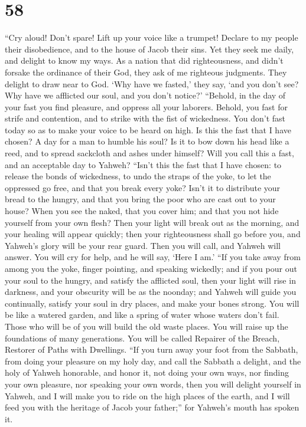 \hypertarget{section-55}{%
\section{58}\label{section-55}}

 ``Cry aloud! Don't spare! Lift up your voice like a
trumpet! Declare to my people their disobedience, and to the house of
Jacob their sins.  Yet they seek me daily, and delight to
know my ways. As a nation that did righteousness, and didn't forsake the
ordinance of their God, they ask of me righteous judgments. They delight
to draw near to God.  `Why have we fasted,' they say, `and
you don't see? Why have we afflicted our soul, and you don't notice?'
``Behold, in the day of your fast you find pleasure, and oppress all
your laborers.  Behold, you fast for strife and
contention, and to strike with the fist of wickedness. You don't fast
today so as to make your voice to be heard on high.  Is
this the fast that I have chosen? A day for a man to humble his soul? Is
it to bow down his head like a reed, and to spread sackcloth and ashes
under himself? Will you call this a fast, and an acceptable day to
Yahweh?  ``Isn't this the fast that I have chosen: to
release the bonds of wickedness, to undo the straps of the yoke, to let
the oppressed go free, and that you break every yoke? 
Isn't it to distribute your bread to the hungry, and that you bring the
poor who are cast out to your house? When you see the naked, that you
cover him; and that you not hide yourself from your own flesh?
 Then your light will break out as the morning, and your
healing will appear quickly; then your righteousness shall go before
you, and Yahweh's glory will be your rear guard.  Then you
will call, and Yahweh will answer. You will cry for help, and he will
say, `Here I am.' ``If you take away from among you the yoke, finger
pointing, and speaking wickedly;  and if you pour out
your soul to the hungry, and satisfy the afflicted soul, then your light
will rise in darkness, and your obscurity will be as the noonday;
 and Yahweh will guide you continually, satisfy your soul
in dry places, and make your bones strong. You will be like a watered
garden, and like a spring of water whose waters don't fail.
 Those who will be of you will build the old waste
places. You will raise up the foundations of many generations. You will
be called Repairer of the Breach, Restorer of Paths with Dwellings.
 ``If you turn away your foot from the Sabbath, from
doing your pleasure on my holy day, and call the Sabbath a delight, and
the holy of Yahweh honorable, and honor it, not doing your own ways, nor
finding your own pleasure, nor speaking your own words, 
then you will delight yourself in Yahweh, and I will make you to ride on
the high places of the earth, and I will feed you with the heritage of
Jacob your father;'' for Yahweh's mouth has spoken it.

